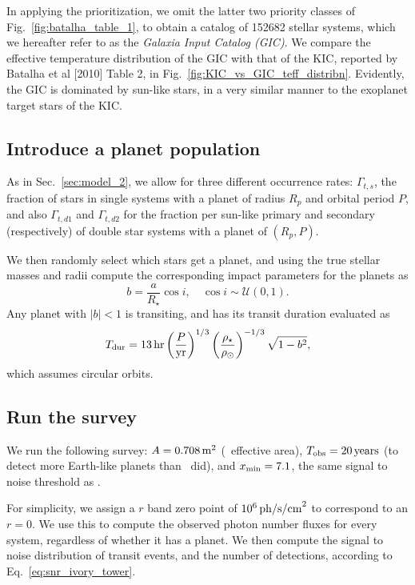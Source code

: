 \documentclass{emulateapj}
\begin{document}
In applying the prioritization, we omit the latter two priority classes of 
Fig.~\ref{fig:batalha_table_1}, to obtain a catalog of 152682 stellar systems, 
which we hereafter refer to as the \textit{Galaxia Input Catalog (GIC)}.
We compare the effective temperature distribution of the GIC with 
that of the KIC, reported by Batalha et al [2010] Table 2, in 
Fig.~\ref{fig:KIC_vs_GIC_teff_distribn}. Evidently, the GIC is 
dominated by sun-like stars, in a very similar manner to the exoplanet target 
stars of the KIC.


\subsection{Introduce a planet population}

As in Sec.~\ref{sec:model_2}, we allow for three different occurrence rates: 
$\Gamma_{t,s}$, the fraction of stars in single systems with a planet of radius 
$R_p$ and orbital period $P$, and also $\Gamma_{t,d1}$ and $\Gamma_{t,d2}$ for 
the fraction per sun-like primary and secondary (respectively) of double star 
systems with a planet of $(R_p, P)$.

We then randomly select which stars get a planet, and using the true stellar 
masses and radii compute the corresponding impact parameters for the planets as
\begin{equation}
b = \frac{a}{R_\star} \cos i, \quad \cos i \sim \mathcal{U}(0,1).
\end{equation}
Any planet with $|b| < 1$ is transiting, and has its transit duration evaluated 
as
\begin{equation}
T_{\rm dur} = 13\,{\rm hr} \left(\frac{P}{{\rm yr}}\right)^{1/3} 
\left(\frac{\rho_\star}{\rho_\odot}\right)^{-1/3} \sqrt{1 - b^2},
\end{equation}
which assumes circular orbits.

\subsection{Run the survey}
We run the following survey:
$A = 0.708\,{\rm m}^2$ (\kepler\ effective area), $T_{\rm obs} = 20\,{\rm 
years}$ (to detect more Earth-like planets than \kepler\ did), and $x_{\rm min} 
= 7.1$, the same signal to noise threshold as \kepler.

For simplicity, we assign a $r$ band zero point of $10^6\,{\rm ph/s/cm}^2$ to 
correspond to an $r=0$. We use this to compute the observed 
photon number fluxes for every system, regardless of whether it has a planet.
We then compute the signal to noise distribution of transit events, and the 
number of detections, according to Eq.~\ref{eq:snr_ivory_tower}.
\end{document}
